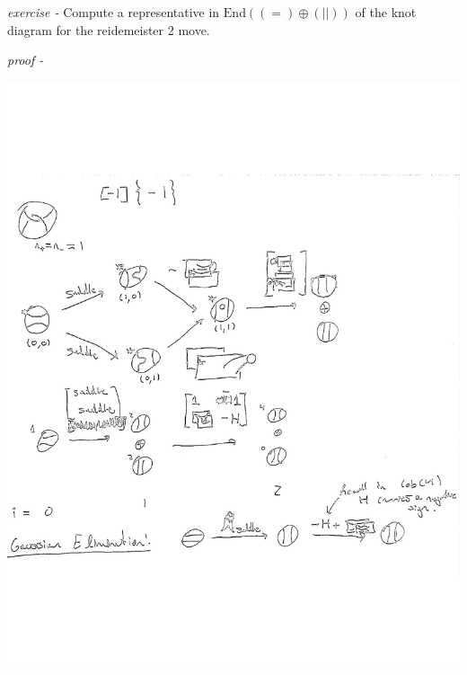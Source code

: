 \documentclass[11pt]{article}
\theoremstyle{definition}
\newcommand{\abs}[1]{\lvert#1\rvert}
\begin{document}

    \emph{exercise - } Compute a representative in \(\text{End}((=) \oplus (\abs{}))\) of the knot diagram for the reidemeister 2 move.

    \emph{proof - }

    \begin{center}
        \includegraphics[width=\linewidth]{additional pdfs/Deloop in Cob4.pdf}
    \end{center}


\end{document}
